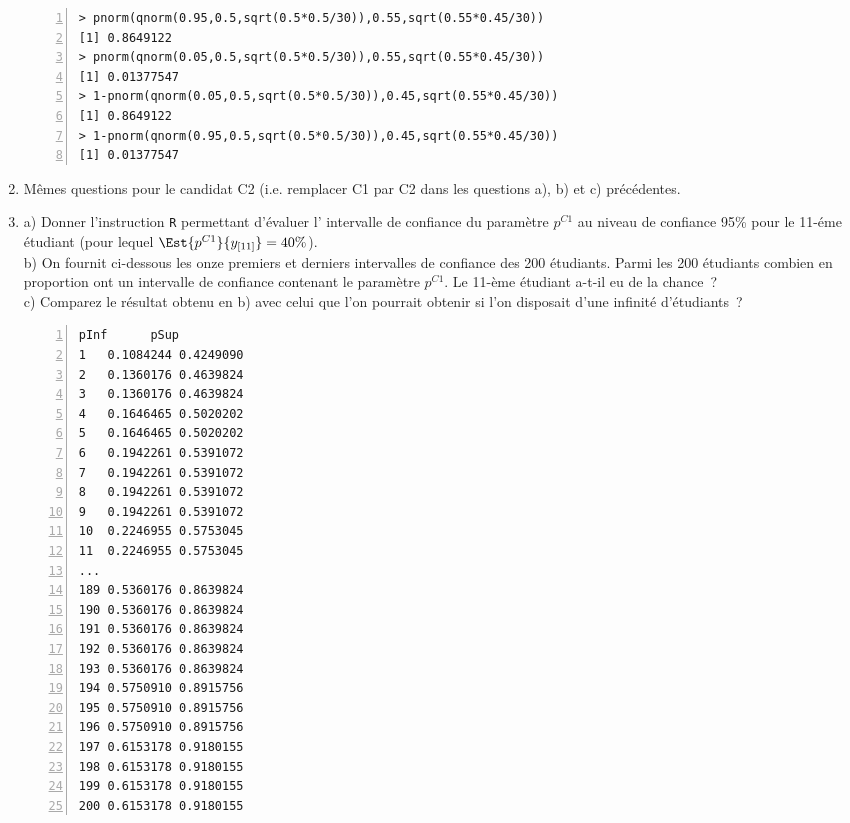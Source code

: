 \documentclass[10pt]{report}
\begin{document}
\begin{exercice}
\begin{enumerate}
\begin{Verbatim}[frame=leftline,fontfamily=tt,fontshape=n,numbers=left]
> pnorm(qnorm(0.95,0.5,sqrt(0.5*0.5/30)),0.55,sqrt(0.55*0.45/30))
[1] 0.8649122
> pnorm(qnorm(0.05,0.5,sqrt(0.5*0.5/30)),0.55,sqrt(0.55*0.45/30))
[1] 0.01377547
> 1-pnorm(qnorm(0.05,0.5,sqrt(0.5*0.5/30)),0.45,sqrt(0.55*0.45/30))
[1] 0.8649122
> 1-pnorm(qnorm(0.95,0.5,sqrt(0.5*0.5/30)),0.45,sqrt(0.55*0.45/30))
[1] 0.01377547
\end{Verbatim}


\item Mêmes questions pour le candidat C2 (i.e. remplacer C1 par C2 dans les questions a), b) et c) précédentes.



\item 
a) Donner l'instruction \texttt{R} permettant d'évaluer l' intervalle de confiance du paramètre $p^{C1}$ au niveau de confiance 95\% pour le 11-éme étudiant (pour lequel $\Est{p^{C1}}{y_{[11]}}=40\%$). \\
b) On fournit ci-dessous les onze premiers et derniers intervalles de confiance des 200 étudiants. Parmi les 200 étudiants combien en proportion ont un intervalle de confiance contenant le paramètre $p^{C1}$. Le 11-ème étudiant a-t-il eu de la chance~?\\
c) Comparez le résultat obtenu en b) avec celui que l'on pourrait obtenir si l'on disposait d'une infinité d'étudiants~?

\begin{Verbatim}[frame=leftline,fontfamily=tt,fontshape=n,numbers=left]
pInf      pSup
1   0.1084244 0.4249090
2   0.1360176 0.4639824
3   0.1360176 0.4639824
4   0.1646465 0.5020202
5   0.1646465 0.5020202
6   0.1942261 0.5391072
7   0.1942261 0.5391072
8   0.1942261 0.5391072
9   0.1942261 0.5391072
10  0.2246955 0.5753045
11  0.2246955 0.5753045
...
189 0.5360176 0.8639824
190 0.5360176 0.8639824
191 0.5360176 0.8639824
192 0.5360176 0.8639824
193 0.5360176 0.8639824
194 0.5750910 0.8915756
195 0.5750910 0.8915756
196 0.5750910 0.8915756
197 0.6153178 0.9180155
198 0.6153178 0.9180155
199 0.6153178 0.9180155
200 0.6153178 0.9180155
\end{Verbatim}


\end{enumerate}
\end{exercice}
\end{document}
